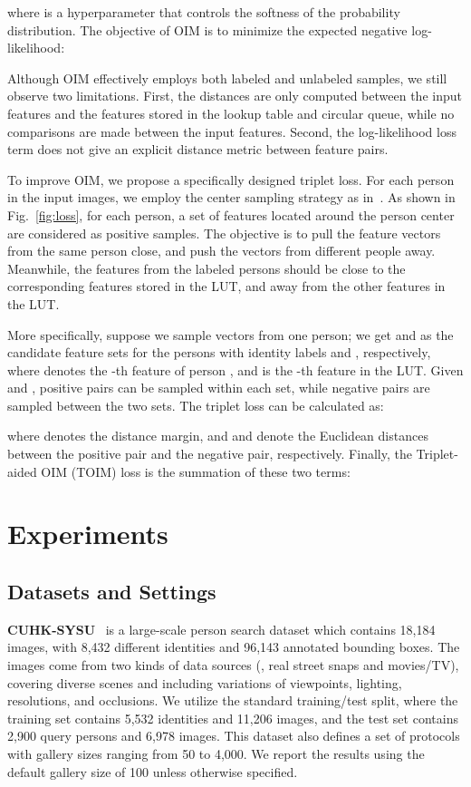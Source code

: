 \documentclass[final]{cvpr}
\begin{document}
where  is a hyperparameter that controls the softness of the probability distribution. The objective of OIM is to minimize the expected negative log-likelihood:


Although OIM effectively employs both labeled and unlabeled samples, we still observe two limitations. First, the distances are only computed between the input features and the features stored in the lookup table and circular queue, while no comparisons are made between the input features. Second, the log-likelihood loss term does not give an explicit distance metric between feature pairs. 

To improve OIM, we propose a specifically designed triplet loss. For each person in the input images, we employ the center sampling strategy as in~\cite{DBLP:journals/tip/KongSLJLS20}. As shown in Fig.~\ref{fig:loss}, for each person, a set of features located around the person center are considered as positive samples. The objective is to pull the feature vectors from the same person close, and push the vectors from different people away. Meanwhile, the features from the labeled persons should be close to the corresponding features stored in the LUT, and away from the other features in the LUT.

More specifically, suppose we sample  vectors from one person; we get  and  as the candidate feature sets for the persons with identity labels  and , respectively, where  denotes the -th feature of person , and  is the -th feature in the LUT. Given  and , positive pairs can be sampled within each set, while negative pairs are sampled between the two sets. The triplet loss can be calculated as:

where  denotes the distance margin, and  and  denote the Euclidean distances between the positive pair and the negative pair, respectively. Finally, the Triplet-aided OIM (TOIM) loss is the summation of these two terms:



\section{Experiments}


\subsection{Datasets and Settings}
\textbf{CUHK-SYSU}~\cite{DBLP:conf/cvpr/XiaoLWLW17} is a large-scale person search dataset which contains 18,184 images, with 8,432 different identities and 96,143 annotated bounding boxes. The images come from two kinds of data sources (\ie, real street snaps and movies/TV),
covering diverse scenes and including variations of viewpoints, lighting, resolutions, and occlusions.
We utilize the standard training/test split, where the training set contains 5,532 identities and 11,206 images, and the test set contains 2,900 query persons and 6,978 images. This dataset also defines a set of protocols with gallery sizes ranging from 50 to 4,000. We report the results using the default gallery size of 100 unless otherwise specified.
\end{document}
